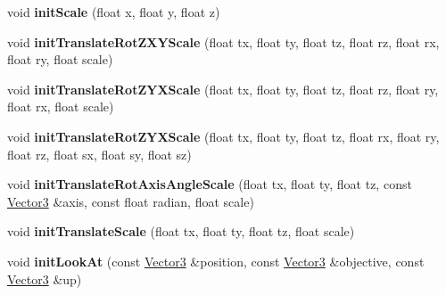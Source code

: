 \begin{DoxyCompactItemize}
\item 
void {\bfseries init\+Scale} (float x, float y, float z)\hypertarget{class_i_dream_sky_1_1_matrix4_a2191a5c0773e1f012ff997a8289da8a3}{}\label{class_i_dream_sky_1_1_matrix4_a2191a5c0773e1f012ff997a8289da8a3}

\item 
void {\bfseries init\+Translate\+Rot\+Z\+X\+Y\+Scale} (float tx, float ty, float tz, float rz, float rx, float ry, float scale)\hypertarget{class_i_dream_sky_1_1_matrix4_a1d5797189e531ef8bb9cb7cdeb0ad6a4}{}\label{class_i_dream_sky_1_1_matrix4_a1d5797189e531ef8bb9cb7cdeb0ad6a4}

\item 
void {\bfseries init\+Translate\+Rot\+Z\+Y\+X\+Scale} (float tx, float ty, float tz, float rz, float ry, float rx, float scale)\hypertarget{class_i_dream_sky_1_1_matrix4_aec4cbc0ec773a4ec9da6480dc988b676}{}\label{class_i_dream_sky_1_1_matrix4_aec4cbc0ec773a4ec9da6480dc988b676}

\item 
void {\bfseries init\+Translate\+Rot\+Z\+Y\+X\+Scale} (float tx, float ty, float tz, float rx, float ry, float rz, float sx, float sy, float sz)\hypertarget{class_i_dream_sky_1_1_matrix4_aa45ca6449f35c2fb3fabd06374109ceb}{}\label{class_i_dream_sky_1_1_matrix4_aa45ca6449f35c2fb3fabd06374109ceb}

\item 
void {\bfseries init\+Translate\+Rot\+Axis\+Angle\+Scale} (float tx, float ty, float tz, const \hyperlink{class_i_dream_sky_1_1_vector3}{Vector3} \&axis, const float radian, float scale)\hypertarget{class_i_dream_sky_1_1_matrix4_a3491767885ba86e1b520210d5f232dff}{}\label{class_i_dream_sky_1_1_matrix4_a3491767885ba86e1b520210d5f232dff}

\item 
void {\bfseries init\+Translate\+Scale} (float tx, float ty, float tz, float scale)\hypertarget{class_i_dream_sky_1_1_matrix4_ac1ef352277828ef1bc8ad04b6632a1f0}{}\label{class_i_dream_sky_1_1_matrix4_ac1ef352277828ef1bc8ad04b6632a1f0}

\item 
void {\bfseries init\+Look\+At} (const \hyperlink{class_i_dream_sky_1_1_vector3}{Vector3} \&position, const \hyperlink{class_i_dream_sky_1_1_vector3}{Vector3} \&objective, const \hyperlink{class_i_dream_sky_1_1_vector3}{Vector3} \&up)\hypertarget{class_i_dream_sky_1_1_matrix4_ac4acd38c64bb1cdfc15c20ade6a5cf44}{}\label{class_i_dream_sky_1_1_matrix4_ac4acd38c64bb1cdfc15c20ade6a5cf44}


\end{DoxyCompactItemize}
